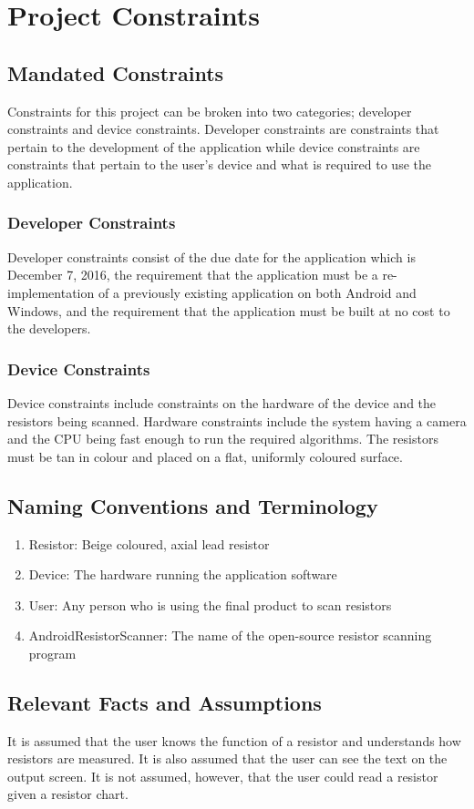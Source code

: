 \documentclass{article}
\begin{document}
\section{Project Constraints}

\subsection{Mandated Constraints}
Constraints for this project can be broken into two categories; developer constraints and device constraints. Developer constraints are constraints that pertain to the development of the application while device constraints are constraints that pertain to the user's device and what is required to use the application. 
\subsubsection{Developer Constraints}
Developer constraints consist of the due date for the application which is December 7, 2016, the requirement that the application must be a re-implementation of a previously existing application on both Android and Windows, and the requirement that the application must be built at no cost to the developers.
\subsubsection{Device Constraints}
Device constraints include constraints on the hardware of the device and the resistors being scanned. Hardware constraints include the system having a camera and the CPU being fast enough to run the required algorithms. The resistors must be tan in colour and placed on a  flat, uniformly coloured surface.

\subsection{Naming Conventions and Terminology }
\begin{enumerate}
\item Resistor: Beige coloured, axial lead resistor
\item Device: The hardware running the application software
\item User: Any person who is using the final product to scan resistors
\item AndroidResistorScanner: The name of the open-source resistor scanning program
\end{enumerate}


\subsection{Relevant Facts and Assumptions}
It is assumed that the user knows the function of a resistor and understands how resistors are measured. It is also assumed that the user can see the text on the output screen. It is not assumed, however, that the user could read a resistor given a resistor chart.
\end{document}
